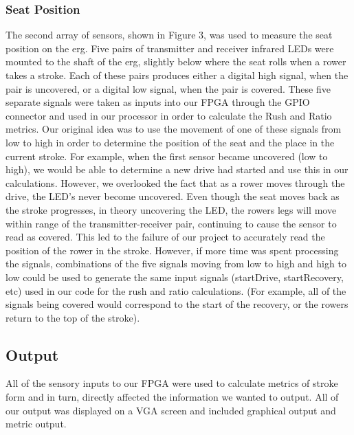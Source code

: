 \documentclass[letterpaper]{article} %
\begin{document}
\subsubsection{Seat Position}
The second array of sensors, shown in Figure 3, was used to measure the seat position on the erg. Five pairs of transmitter and receiver infrared LEDs were mounted to the shaft of the erg, slightly below where the seat rolls when a rower takes a stroke. Each of these pairs produces either a digital high signal, when the pair is uncovered, or a digital low signal, when the pair is covered. These five separate signals were taken as inputs into our FPGA through the GPIO connector and used in our processor in order to calculate the Rush and Ratio metrics.
Our original idea was to use the movement of one of these signals from low to high in order to determine the position of the seat and the place in the current stroke. For example, when the first sensor became uncovered (low to high), we would be able to determine a new drive had started and use this in our calculations. However, we overlooked the fact that as a rower moves through the drive, the LED's never become uncovered. Even though the seat moves back as the stroke progresses, in theory uncovering the LED, the rowers legs will move within range of the transmitter-receiver pair, continuing to cause the sensor to read as covered. This led to the failure of our project to accurately read the position of the rower in the stroke. However, if more time was spent processing the signals, combinations of the five signals moving from low to high and high to low could be used to generate the same input signals (startDrive, startRecovery, etc) used in our code for the rush and ratio calculations. (For example, all of the signals being covered would correspond to the start of the recovery, or the rowers return to the top of the stroke).
\subsection{Output}
All of the sensory inputs to our FPGA were used to calculate metrics of stroke form and in turn, directly affected the information we wanted to output. All of our output was displayed on a VGA screen and included graphical output and metric output.
\end{document}
